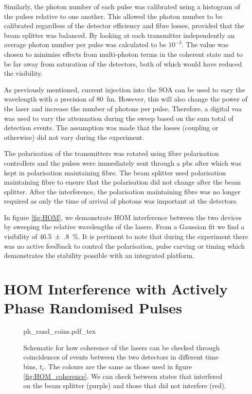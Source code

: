 Similarly, the photon number of each pulse was calibrated using a histogram of the pulses relative to one another. This allowed the photon number to be calibrated regardless of the detector efficiency and fibre losses, provided that the beam splitter was balanced. By looking at each transmitter independently an average photon number per pulse was calculated to be $10^{-3}$. The value was chosen to minimise effects from multi-photon terms in the coherent state and to be far away from saturation of the detectors, both of which would have reduced the visibility.

As previously mentioned, current injection into the \ac{SOA} can be used to vary the wavelength with a precision of \SI{80}{\femto\metre}. However, this will also change the power of the laser and increase the number of photons per pulse. Therefore, a digital \ac{voa} was used to vary the attenuation during the sweep based on the sum total of detection events. The assumption was made that the losses (coupling or otherwise) did not vary during the experiment. 

The polarisation of the transmitters was rotated using fibre polarisation controllers and the pulses were immediately sent through a \ac{pbs} after which was kept in polarisation maintaining fibre. The beam splitter used polarisation maintaining fibre to ensure that the polarisation did not change after the beam splitter. After the interference, the polarisation maintaining fibre was no longer required as only the time of arrival of photons was important at the detectors.

In figure \ref{fig:HOM}, we demonstrate \acl{HOM} interference between the two devices by sweeping the relative wavelengths of the lasers. From a Gaussian fit we find a visibility of \SI{46.5(8)}{\percent}. It is pertinent to note that during the experiment there was no active feedback to control the polarisation, pulse carving or timing which demonstrates the stability possible with an integrated platform. 

\section{HOM Interference with Actively Phase Randomised Pulses}
\label{sec:HOM_random}

\begin{figure}[t]
	\centering
	\def\svgwidth{0.7\textwidth} 
	{ph_rand_coins.pdf_tex}
	\caption[Schematic for phase randomisation coherence check]{Schematic for how coherence of the lasers can be checked through coincidences of events between the two detectors in different time bins, $t_i$. The colours are the same as those used in figure \ref{fig:HOM_coherence}. We can check between states that interfered on the beam splitter (purple) and those that did not interfere (red).}	
	\label{fig:ph_rand_coins}
\end{figure}

